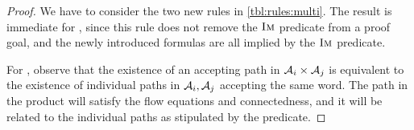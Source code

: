 \begin{proof}
  We have to consider the two new rules in \cref{tbl:rules:multi}. The
  result is immediate for \ExpandM{}, since this rule does not remove the
  $\operatorname{\textsc{Im}}$ predicate from a proof goal, and the newly introduced formulas
  are all implied by the $\operatorname{\textsc{Im}}$ predicate.

  For \Materialise{}, observe that the existence of an accepting path
  in $\mathcal{A}_i \times \mathcal{A}_j$ is equivalent to the existence
  of individual paths in $\mathcal{A}_i, \mathcal{A}_j$ accepting the
  same word. The path in the product will satisfy the flow equations
  and connectedness, and it will be related to the individual paths as
  stipulated by the \BindingSum{} predicate.
\end{proof}